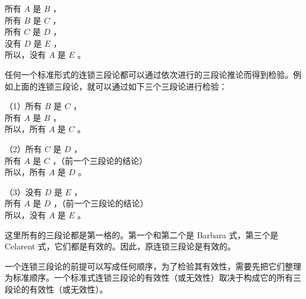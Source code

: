 所有 $A$ 是 $B$ ，\\
所有 $B$ 是 $C$ ，\\
所有 $C$ 是 $D$ ，\\
没有 $D$ 是 $E$ ，\\
所以，没有 $A$ 是 $E$ 。

任何一个标准形式的连锁三段论都可以通过依次进行的三段论推论而得到检验。例如上面的连锁三段论，就可以通过如下三个三段论进行检验：

（1）所有 $B$ 是 $C$ ，\\
所有 $A$ 是 $B$ ，\\
所以，所有 $A$ 是 $C$ 。

（2）所有 $C$ 是 $D$ ，\\
所有 $A$ 是 $C$ ，（前一个三段论的结论）\\
所以，所有 $A$ 是 $D$ 。

（3）没有 $D$ 是 $E$ ，\\
所有 $A$ 是 $D$ ，（前一个三段论的结论）\\
所以，没有 $A$ 是 $E$ 。

这里所有的三段论都是第一格的。第一个和第二个是 Barbara 式，第三个是 Celarent 式，它们都是有效的。因此，原连锁三段论是有效的。

一个连锁三段论的前提可以写成任何顺序，为了检验其有效性，需要先把它们整理为标准顺序。一个标准式连锁三段论的有效性（或无效性）取决于构成它的所有三段论的有效性（或无效性）。 